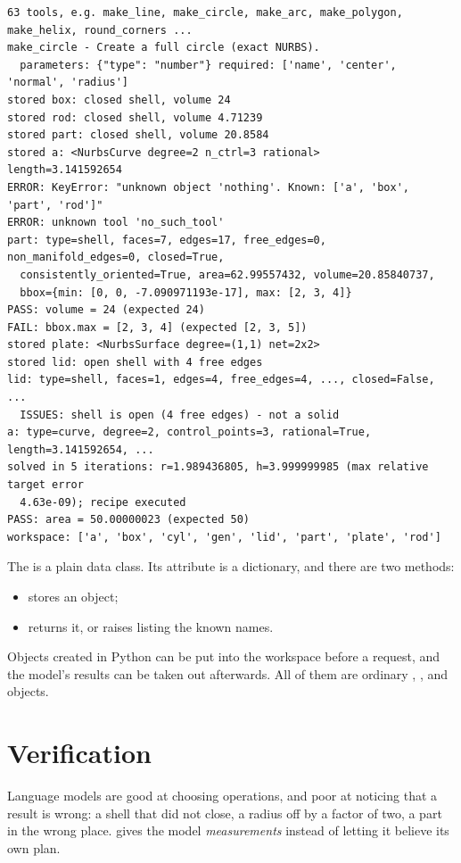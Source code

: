 \begin{lstlisting}[style=text]
63 tools, e.g. make_line, make_circle, make_arc, make_polygon, make_helix, round_corners ...
make_circle - Create a full circle (exact NURBS).
  parameters: {"type": "number"} required: ['name', 'center', 'normal', 'radius']
stored box: closed shell, volume 24
stored rod: closed shell, volume 4.71239
stored part: closed shell, volume 20.8584
stored a: <NurbsCurve degree=2 n_ctrl=3 rational>
length=3.141592654
ERROR: KeyError: "unknown object 'nothing'. Known: ['a', 'box', 'part', 'rod']"
ERROR: unknown tool 'no_such_tool'
part: type=shell, faces=7, edges=17, free_edges=0, non_manifold_edges=0, closed=True,
  consistently_oriented=True, area=62.99557432, volume=20.85840737,
  bbox={min: [0, 0, -7.090971193e-17], max: [2, 3, 4]}
PASS: volume = 24 (expected 24)
FAIL: bbox.max = [2, 3, 4] (expected [2, 3, 5])
stored plate: <NurbsSurface degree=(1,1) net=2x2>
stored lid: open shell with 4 free edges
lid: type=shell, faces=1, edges=4, free_edges=4, ..., closed=False, ...
  ISSUES: shell is open (4 free edges) - not a solid
a: type=curve, degree=2, control_points=3, rational=True, length=3.141592654, ...
solved in 5 iterations: r=1.989436805, h=3.999999985 (max relative target error
  4.63e-09); recipe executed
PASS: area = 50.00000023 (expected 50)
workspace: ['a', 'box', 'cyl', 'gen', 'lid', 'part', 'plate', 'rod']
\end{lstlisting}

The  is a plain data class. Its  attribute is a dictionary, and
there are two methods:
\begin{itemize}
  \item {} stores an object;
  \item {} returns it, or raises  listing the known names.
\end{itemize}
Objects created in Python can be put into the workspace before a request, and the model's
results can be taken out afterwards. All of them are ordinary ,
,  and  objects.

\section{Verification}\label{sec:llm-verify}

Language models are good at choosing operations, and poor at noticing that a result is wrong:
a shell that did not close, a radius off by a factor of two, a part in the wrong place. \NF{}
gives the model \emph{measurements} instead of letting it believe its own plan.

